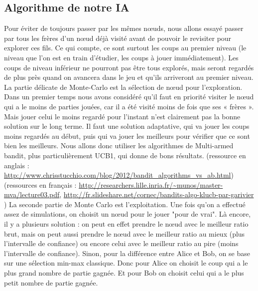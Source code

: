 \subsection {Algorithme de notre IA}
Pour éviter de toujours passer par les mêmes nœuds, nous allons essayé passer par tous les frères d’un nœud déjà visité avant de pouvoir le revisiter pour explorer ces fils. Ce qui compte, ce sont surtout les coups au premier niveau (le niveau que l’on est en train d’étudier, les coups à jouer immédiatement). Les coups de niveau inférieur ne pourront pas être tous explorés, mais seront regardés de plus près quand on avancera dans le jeu et qu'ils arriveront au premier niveau.
La partie délicate de Monte-Carlo est la sélection de nœud pour l'exploration. Dans un premier temps nous avons considéré  qu’il faut en priorité visiter le nœud qui a le moins de parties jouées, car il a été visité moins de fois que ses « frères ». Mais jouer celui le moins regardé pour l'instant n'est clairement pas la bonne solution sur le long terme. Il faut une solution adaptative, qui va jouer les coups moins regardés au début, puis qui va jouer les meilleurs pour vérifier que ce sont bien les meilleurs. Nous allons donc utiliser les algorithmes de Multi-armed bandit, plus particulièrement UCB1, qui donne de bons résultats.
(ressource en anglais : \url{http://www.chrisstucchio.com/blog/2012/bandit_algorithms_vs_ab.html})
(ressources en français : \url{http://researchers.lille.inria.fr/~munos/master-mva/lecture03.pdf}, \url{http://fr.slideshare.net/cornec/bandits-algo-klucb-par-garivier} )
La seconde partie de Monte Carlo est l'exploitation. Une fois qu'on a effectué assez de simulations, on choisit un nœud pour le jouer "pour de vrai". Là encore, il y a plusieurs solution : on peut en effet prendre le nœud avec le meilleur ratio brut, mais on peut aussi prendre le nœud avec le meilleur ratio au mieux (plus l'intervalle de confiance) ou encore celui avec le meilleur ratio au pire (moins l'intervalle de confiance). 
Sinon, pour la différence entre Alice et Bob, on se base sur une sélection min-max classique. Donc pour Alice on choisit le coup qui a le plus grand nombre de partie gagnée. Et pour Bob on choisit celui qui a le plus petit nombre de partie gagnée. 
